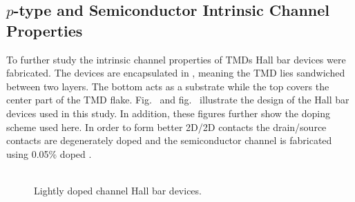 \subsection{$p$-type  and  Semiconductor Intrinsic Channel Properties}\label{subsec:mos2_intrinsic_properties}
To further study the intrinsic channel properties of \acp{TMD} Hall bar devices were fabricated. The devices are encapsulated in \hbn, meaning the \acs{TMD} lies sandwiched between two \hbn layers. The bottom \hbn acts as a substrate while the top \hbn covers the center part of the \acs{TMD} flake. Fig.~ and fig.~ illustrate the design of the Hall bar devices used in this study. In addition, these figures further show the doping scheme used here. In order to form better 2D/2D contacts the drain/source contacts are degenerately doped  and the semiconductor channel is fabricated using 0.05\%  doped . \\ \\ 
\begin{figure}[ht]
	\centering
	\qquad
	\caption[0.05\%  channel doped  Hall bar devices]{Lightly doped channel  Hall bar devices.}
	\label{fig:hall_bar_NbWSe2_devices}
\end{figure}
 
